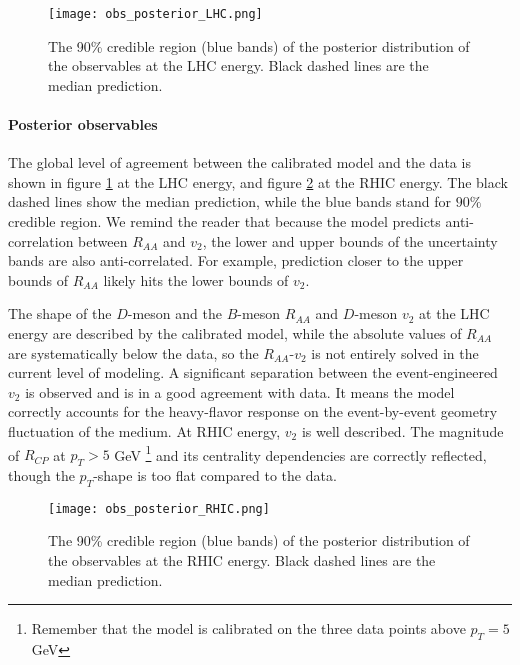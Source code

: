 \begin{figure}
\singlespacing
\centering
\texttt{[image: obs\_posterior\_LHC.png]}
\caption[The 90\% credible region (blue bands) of the posterior distribution]{The 90\% credible region (blue bands) of the posterior distribution of the observables at the LHC energy. Black dashed lines are the median prediction.}
\label{fig:new:obs_posterior_LHC}
\end{figure}

\paragraph{Posterior observables} The global level of agreement between the calibrated model and the data is shown in figure \ref{fig:new:obs_posterior_LHC} at the LHC energy, and figure \ref{fig:new:obs_posterior_RHIC} at the RHIC energy.
The black dashed lines show the median prediction, while the blue bands stand for $90\%$ credible region.
We remind the reader that because the model predicts anti-correlation between $R_{AA}$ and $v_2$, the lower and upper bounds of the uncertainty bands are also anti-correlated.
For example, prediction closer to the upper bounds of $R_{AA}$ likely hits the lower bounds of $v_2$.

The shape of the $D$-meson and the $B$-meson $R_{AA}$ and $D$-meson $v_2$ at the LHC energy are described by the calibrated model, while the absolute values of $R_{AA}$ are systematically below the data, so the $R_{AA}$-$v_2$ is not entirely solved in the current level of modeling.
A significant separation between the event-engineered $v_2$ is observed and is in a good agreement with data.
It means the model correctly accounts for the heavy-flavor response on the event-by-event geometry fluctuation of the medium.
At RHIC energy, $v_2$ is well described.  
The magnitude of $R_{CP}$ at $p_T> 5$ GeV \footnote{\singlespacing  Remember that the model is calibrated on the three data points above $p_T=5$ GeV} and its centrality dependencies are correctly reflected, though the $p_T$-shape is too flat compared to the data.

\begin{figure}
\singlespacing
\centering
\texttt{[image: obs\_posterior\_RHIC.png]}
\caption[The 90\% credible region (blue bands) of the posterior distribution]{The 90\% credible region (blue bands) of the posterior distribution of the observables at the RHIC energy. Black dashed lines are the median prediction.}
\label{fig:new:obs_posterior_RHIC}
\end{figure}

